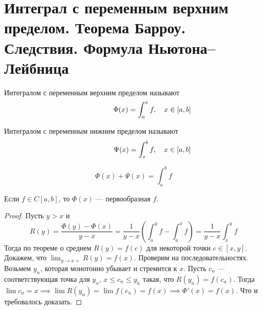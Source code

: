 \section{Интеграл с переменным верхним пределом. Теорема Барроу. Следствия. Формула Ньютона–Лейбница}
\begin{conj}
  Интегралом с переменным верхним пределом называют
  \begin{equation*}
    \hphantom{, \quad x \in [a, b]}
    \Phi(x) = \int_{a}^{x} f
    , \quad x \in [a, b]
  \end{equation*}
\end{conj}

\begin{conj}
    Интегралом с переменным нижним пределом называют
    \begin{equation*}
      \hphantom{, \quad x \in [a, b]}
      \Psi(x) = \int_{x}^{b} f
      , \quad x \in [a, b]
    \end{equation*}
\end{conj}

\begin{notice}
    \begin{equation*}
      \Phi(x) + \Psi(x) = \int_{a}^{b} f
    \end{equation*}
\end{notice}

\begin{theorem}[Барроу]
    Если $f \in C[a, b]$, то $\Phi(x)$ --- первообразная $f$.
\end{theorem}
\begin{proof}
    Пусть $y > x$ и
    \begin{equation*}
      R(y) = \frac{\Phi(y) - \Phi(x)}{y - x} = \frac{1}{y - x}\left(\int_{a}^{y} f - \int_{a}^{x} f\right) = \frac{1}{y - x}\int_{x}^{y} f
    \end{equation*}
    Тогда по теореме о среднем $R(y) = f(c)$ для некоторой точки $c \in [x, y]$. Докажем, что $\lim_{y \to x+} R(y) = f(x)$. Проверим на последовательностях. Возьмем $y_n$, которая монотонно убывает и стремится к $x$. Пусть $c_n$ --- соответствующая точка для $y_n$,\; $x \leq c_n \leq y_n$ такая, что $R(y_n) = f(c_n)$. Тогда $\lim c_n = x \implies \lim R(y_n) = \lim f(c_n) = f(x) \implies \Phi'(x) = f(x)$. Что и требовалось доказать.
\end{proof}

